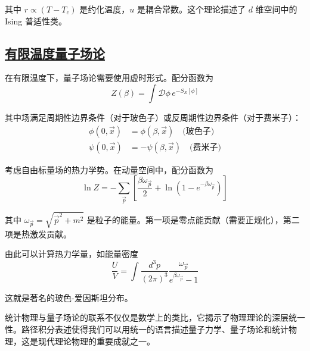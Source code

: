 其中 $r \propto (T - T_c)$ 是约化温度，$u$ 是耦合常数。这个理论描述了 $d$ 维空间中的 Ising 普适性类。

\subsection{\protect\hyperlink{:}{有限温度量子场论}}

在有限温度下，量子场论需要使用虚时形式。配分函数为
\begin{equation}
    Z(\beta) = \int \mathcal{D}\phi \, e^{-S_E[\phi]}
\end{equation}

其中场满足周期性边界条件（对于玻色子）或反周期性边界条件（对于费米子）：
\begin{align}
    \phi(0, \vec{x}) &= \phi(\beta, \vec{x}) \quad \text{(玻色子)} \\
    \psi(0, \vec{x}) &= -\psi(\beta, \vec{x}) \quad \text{(费米子)}
\end{align}

\begin{example}[热力学势的计算]
    考虑自由标量场的热力学势。在动量空间中，配分函数为
    \begin{equation*}
        \ln Z = -\sum_{\vec{p}} \left[\frac{\beta\omega_{\vec{p}}}{2} + \ln\left(1 - e^{-\beta\omega_{\vec{p}}}\right)\right]
    \end{equation*}

    其中 $\omega_{\vec{p}} = \sqrt{\vec{p}^2 + m^2}$ 是粒子的能量。第一项是零点能贡献（需要正规化），第二项是热激发贡献。

    由此可以计算热力学量，如能量密度
    \begin{equation*}
        \frac{U}{V} = \int \frac{d^3p}{(2\pi)^3} \frac{\omega_{\vec{p}}}{e^{\beta\omega_{\vec{p}}} - 1}
    \end{equation*}

    这就是著名的玻色-爱因斯坦分布。
\end{example}

\begin{remark}
    统计物理与量子场论的联系不仅仅是数学上的类比，它揭示了物理理论的深层统一性。路径积分表述使得我们可以用统一的语言描述量子力学、量子场论和统计物理，这是现代理论物理的重要成就之一。
\end{remark}
